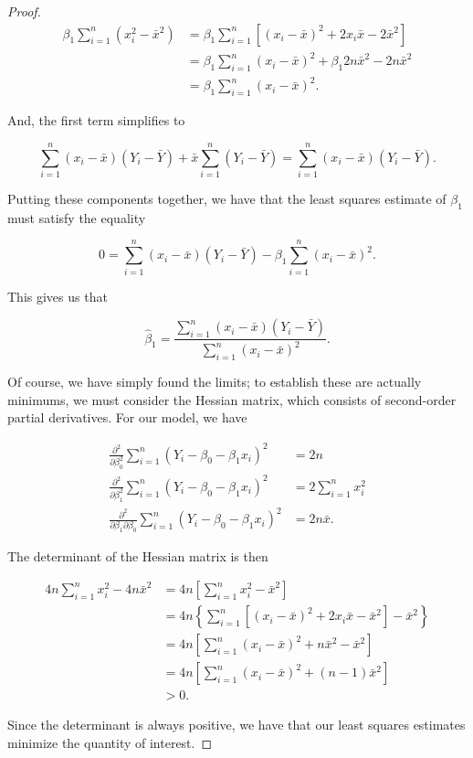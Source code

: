 \documentclass[
  letterpaper,
  DIV=11,
  numbers=noendperiod]{scrreprt}
\theoremstyle{definition}
\theoremstyle{definition}
\theoremstyle{plain}
\theoremstyle{remark}
\begin{document}
\begin{proof}
\[
\begin{aligned}
  \beta_1 \sum_{i=1}^{n} \left(x_i^2 - \bar{x}^2\right)
    &= \beta_1 \sum_{i=1}^{n} \left[\left(x_i - \bar{x}\right)^2 + 2x_i\bar{x} - 2\bar{x}^2\right] \\
    &= \beta_1\sum_{i=1}^{n}\left(x_i - \bar{x}\right)^2 + \beta_1 2 n\bar{x}^2 - 2n\bar{x}^2 \\
    &= \beta_1 \sum_{i=1}^{n} \left(x_i - \bar{x}\right)^2.
\end{aligned}
\]

And, the first term simplifies to

\[\sum_{i=1}^{n} \left(x_i - \bar{x}\right)\left(Y_i - \bar{Y}\right) + \bar{x} \sum_{i=1}^{n} \left(Y_i - \bar{Y}\right) = \sum_{i=1}^{n} \left(x_i - \bar{x}\right)\left(Y_i - \bar{Y}\right).\]

Putting these components together, we have that the least squares
estimate of \(\beta_1\) must satisfy the equality

\[0 = \sum_{i=1}^{n} \left(x_i - \bar{x}\right)\left(Y_i - \bar{Y}\right) - \beta_1 \sum_{i=1}^{n} \left(x_i - \bar{x}\right)^2.\]

This gives us that

\[\widehat{\beta}_1 = \frac{\sum_{i=1}^{n} \left(x_i - \bar{x}\right)\left(Y_i - \bar{Y}\right)}{\sum_{i=1}^{n} \left(x_i - \bar{x}\right)^2}.\]

Of course, we have simply found the limits; to establish these are
actually minimums, we must consider the Hessian matrix, which consists
of second-order partial derivatives. For our model, we have

\[
\begin{aligned}
  \frac{\partial^2}{\partial \beta_0^2} \sum_{i=1}^{n} \left(Y_i - \beta_0 - \beta_1 x_i\right)^2
    &= 2n \\
  \frac{\partial^2}{\partial \beta_1^2} \sum_{i=1}^{n} \left(Y_i - \beta_0 - \beta_1 x_i\right)^2
    &= 2\sum_{i=1}^{n} x_i^2\\
  \frac{\partial^2}{\partial \beta_1 \partial \beta_0} \sum_{i=1}^{n} \left(Y_i - \beta_0 - \beta_1 x_i\right)^2  
    &= 2n\bar{x}.
\end{aligned}
\]

The determinant of the Hessian matrix is then

\[
\begin{aligned}
  4n\sum_{i=1}^{n} x_i^2 - 4n\bar{x}^2 
    &= 4n\left[\sum_{i=1}^{n} x_i^2 - \bar{x}^2\right] \\
    &= 4n\left\{\sum_{i=1}^{n} \left[\left(x_i - \bar{x}\right)^2 + 2x_i\bar{x} - \bar{x}^2\right] - \bar{x}^2\right\} \\
    &= 4n \left[\sum_{i=1}^{n} \left(x_i - \bar{x}\right)^2 + n\bar{x}^2 - \bar{x}^2\right] \\
    &= 4n \left[\sum_{i=1}^{n} \left(x_i - \bar{x}\right)^2 + (n - 1)\bar{x}^2\right] \\
    &> 0.
\end{aligned}
\]

Since the determinant is always positive, we have that our least squares
estimates minimize the quantity of interest.

\end{proof}
\end{document}
